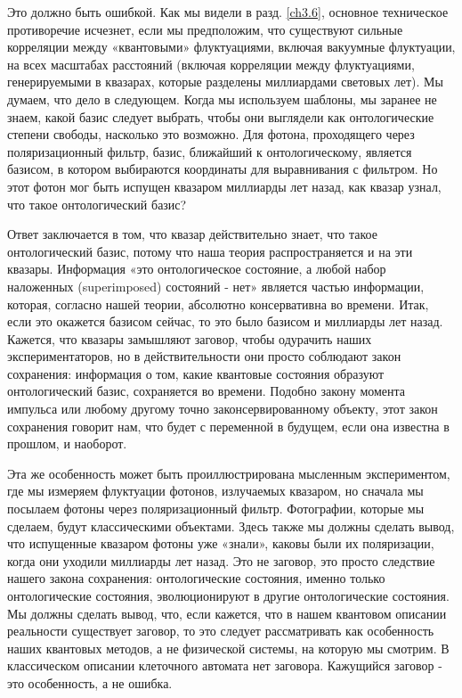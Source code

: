 \documentclass[main.tex]{subfiles}
\begin{document}
Это должно быть ошибкой. Как мы видели в разд. \ref{ch3.6}, основное техническое противоречие исчезнет, если мы предположим, что существуют сильные корреляции между «квантовыми» флуктуациями, включая вакуумные флуктуации, на всех масштабах расстояний (включая корреляции между флуктуациями, генерируемыми в квазарах, которые разделены миллиардами световых лет). Мы думаем, что дело в следующем. Когда мы используем шаблоны, мы заранее не знаем, какой базис следует выбрать, чтобы они выглядели как онтологические степени свободы, насколько это возможно. Для фотона, проходящего через поляризационный фильтр, базис, ближайший к онтологическому, является базисом, в котором выбираются координаты для выравнивания с фильтром. Но этот фотон мог быть испущен квазаром миллиарды лет назад, как квазар узнал, что такое онтологический базис?

Ответ заключается в том, что квазар действительно знает, что такое онтологический базис, потому что наша теория распространяется и на эти квазары. Информация «это онтологическое состояние, а любой набор наложенных (superimposed) состояний - нет» является частью информации, которая, согласно нашей теории, абсолютно консервативна во времени. Итак, если это окажется базисом сейчас, то это было базисом и миллиарды лет назад. Кажется, что квазары замышляют заговор, чтобы одурачить наших экспериментаторов, но в действительности они просто соблюдают закон сохранения: информация о том, какие квантовые состояния образуют онтологический базис, сохраняется во времени. Подобно закону момента импульса или любому другому точно законсервированному объекту, этот закон сохранения говорит нам, что будет с переменной в будущем, если она известна в прошлом, и наоборот.

Эта же особенность может быть проиллюстрирована мысленным экспериментом, где мы измеряем флуктуации фотонов, излучаемых квазаром, но сначала мы посылаем фотоны через поляризационный фильтр. Фотографии, которые мы сделаем, будут классическими объектами. Здесь также мы должны сделать вывод, что испущенные квазаром фотоны уже «знали», каковы были их поляризации, когда они уходили миллиарды лет назад. Это не заговор, это просто следствие нашего закона сохранения: онтологические состояния, именно только онтологические состояния, эволюционируют в другие онтологические состояния.
Мы должны сделать вывод, что, если кажется, что в нашем квантовом описании реальности существует заговор, то это следует рассматривать как особенность наших квантовых методов, а не физической системы, на которую мы смотрим. В классическом описании клеточного автомата нет заговора. Кажущийся заговор - это особенность, а не ошибка.
\end{document}
